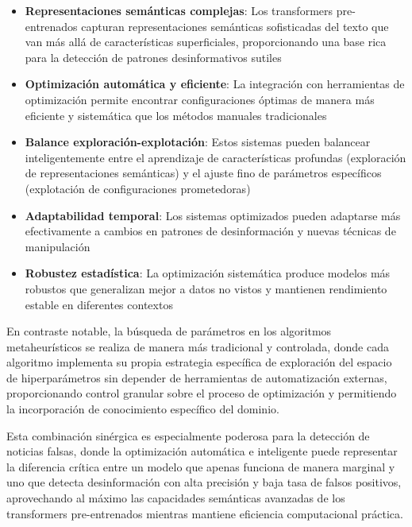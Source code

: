\begin{itemize}
    \item \textbf{Representaciones semánticas complejas}: Los transformers pre-entrenados capturan representaciones semánticas sofisticadas del texto que van más allá de características superficiales, proporcionando una base rica para la detección de patrones desinformativos sutiles
    \item \textbf{Optimización automática y eficiente}: La integración con herramientas de optimización permite encontrar configuraciones óptimas de manera más eficiente y sistemática que los métodos manuales tradicionales
    \item \textbf{Balance exploración-explotación}: Estos sistemas pueden balancear inteligentemente entre el aprendizaje de características profundas (exploración de representaciones semánticas) y el ajuste fino de parámetros específicos (explotación de configuraciones prometedoras)
    \item \textbf{Adaptabilidad temporal}: Los sistemas optimizados pueden adaptarse más efectivamente a cambios en patrones de desinformación y nuevas técnicas de manipulación
    \item \textbf{Robustez estadística}: La optimización sistemática produce modelos más robustos que generalizan mejor a datos no vistos y mantienen rendimiento estable en diferentes contextos
\end{itemize}

En contraste notable, la búsqueda de parámetros en los algoritmos metaheurísticos se realiza de manera más tradicional y controlada, donde cada algoritmo implementa su propia estrategia específica de exploración del espacio de hiperparámetros sin depender de herramientas de automatización externas, proporcionando control granular sobre el proceso de optimización y permitiendo la incorporación de conocimiento específico del dominio.

Esta combinación sinérgica es especialmente poderosa para la detección de noticias falsas, donde la optimización automática e inteligente puede representar la diferencia crítica entre un modelo que apenas funciona de manera marginal y uno que detecta desinformación con alta precisión y baja tasa de falsos positivos, aprovechando al máximo las capacidades semánticas avanzadas de los transformers pre-entrenados mientras mantiene eficiencia computacional práctica.

